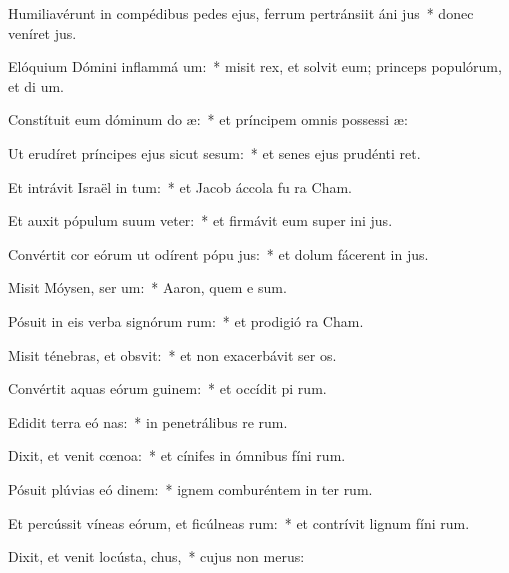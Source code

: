 \item Humiliavérunt in compédibus pedes ejus, ferrum pertránsiit áni jus~* donec veníret  jus.
\item Elóquium Dómini inflammá um:~* misit rex, et solvit eum; princeps populórum, et di um.
\item Constítuit eum dóminum do æ:~* et príncipem omnis possessi æ:
\item Ut erudíret príncipes ejus sicut sesum:~* et senes ejus prudénti ret.
\item Et intrávit Israël in tum:~* et Jacob áccola fu  ra Cham.
\item Et auxit pópulum suum veter:~* et firmávit eum super ini jus.
\item Convértit cor eórum ut odírent pópu jus:~* et dolum fácerent in  jus.
\item Misit Móysen, ser um:~* Aaron, quem e sum.
\item Pósuit in eis verba signórum rum:~* et prodigió  ra Cham.
\item Misit ténebras, et obsvit:~* et non exacerbávit ser os.
\item Convértit aquas eórum  guinem:~* et occídit pi rum.
\item Edidit terra eó nas:~* in penetrálibus re rum.
\item Dixit, et venit cœnoa:~* et cínifes in ómnibus fíni rum.
\item Pósuit plúvias eó dinem:~* ignem comburéntem in ter rum.
\item Et percússit víneas eórum, et ficúlneas rum:~* et contrívit lignum fíni rum.
\item Dixit, et venit locústa,  chus,~* cujus non  merus:
